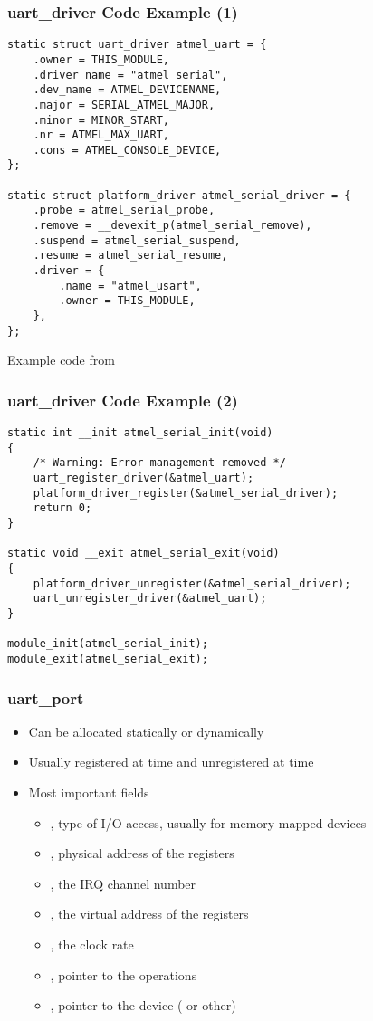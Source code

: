 \begin{frame}[fragile]
  \frametitle{uart\_driver Code Example (1)}
\begin{verbatim}
static struct uart_driver atmel_uart = {
    .owner = THIS_MODULE,
    .driver_name = "atmel_serial",
    .dev_name = ATMEL_DEVICENAME,
    .major = SERIAL_ATMEL_MAJOR,
    .minor = MINOR_START,
    .nr = ATMEL_MAX_UART,
    .cons = ATMEL_CONSOLE_DEVICE,
};

static struct platform_driver atmel_serial_driver = {
    .probe = atmel_serial_probe,
    .remove = __devexit_p(atmel_serial_remove),
    .suspend = atmel_serial_suspend,
    .resume = atmel_serial_resume,
    .driver = {
        .name = "atmel_usart",
        .owner = THIS_MODULE,
    },
};
\end{verbatim}
Example code from 
\end{frame}

\begin{frame}[fragile]
  \frametitle{uart\_driver Code Example (2)}
\begin{verbatim}
static int __init atmel_serial_init(void)
{
    /* Warning: Error management removed */
    uart_register_driver(&atmel_uart);
    platform_driver_register(&atmel_serial_driver);
    return 0;
}

static void __exit atmel_serial_exit(void)
{
    platform_driver_unregister(&atmel_serial_driver);
    uart_unregister_driver(&atmel_uart);
}

module_init(atmel_serial_init);
module_exit(atmel_serial_exit);
\end{verbatim}
\end{frame}

\begin{frame}
  \frametitle{uart\_port}
  \begin{itemize}
  \item Can be allocated statically or dynamically
  \item Usually registered at  time and unregistered at
     time
  \item Most important fields
    \begin{itemize}
    \item {}, type of I/O access, usually 
      for memory-mapped devices
    \item {}, physical address of the registers
    \item {}, the IRQ channel number
    \item {}, the virtual address of the registers
    \item {}, the clock rate
    \item {}, pointer to the operations
    \item {}, pointer to the device (
      or other)
    \end{itemize}
  \end{itemize}
\end{frame}

